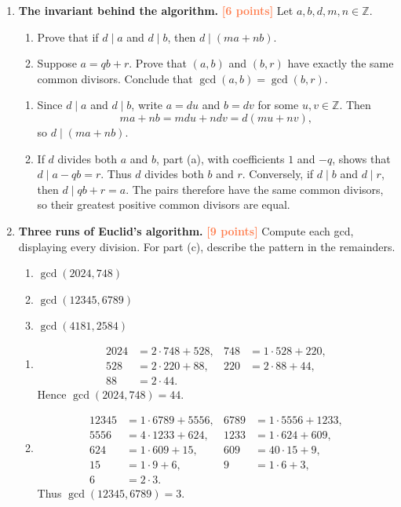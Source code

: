\documentclass[11pt]{article}
\newcommand{\Z}{\mathbb Z}
\newcommand{\divides}{\mid}
\newcommand{\points}[1]{\hfill\textcolor{coral}{\small\bfseries[#1 points]}}
\begin{document}
\begin{enumerate}
\item \textbf{The invariant behind the algorithm.} \points{6}
Let $a,b,d,m,n\in\Z$.
\begin{enumerate}
  \item Prove that if $d\divides a$ and $d\divides b$, then
  $d\divides(ma+nb)$.
  \item Suppose $a=qb+r$. Prove that $(a,b)$ and $(b,r)$ have exactly the
  same common divisors. Conclude that $\gcd(a,b)=\gcd(b,r)$.
\end{enumerate}
\begin{solution}
\begin{enumerate}
  \item Since $d\divides a$ and $d\divides b$, write $a=du$ and $b=dv$ for
  some $u,v\in\Z$. Then
  \[
    ma+nb=mdu+ndv=d(mu+nv),
  \]
  so $d\divides(ma+nb)$.
  \item If $d$ divides both $a$ and $b$, part (a), with coefficients $1$ and
  $-q$, shows that $d\divides a-qb=r$. Thus $d$ divides both $b$ and $r$.
  Conversely, if $d\divides b$ and $d\divides r$, then
  $d\divides qb+r=a$. The pairs therefore have the same common divisors, so
  their greatest positive common divisors are equal.
\end{enumerate}
\end{solution}

\item \textbf{Three runs of Euclid's algorithm.} \points{9}
Compute each gcd, displaying every division. For part (c), describe the pattern
in the remainders.
\begin{enumerate}
  \item $\gcd(2024,748)$
  \item $\gcd(12345,6789)$
  \item $\gcd(4181,2584)$
\end{enumerate}
\begin{solution}
\begin{enumerate}
  \item
  \begin{align*}
  2024&=2\cdot748+528,&748&=1\cdot528+220,\\
  528&=2\cdot220+88,&220&=2\cdot88+44,\\
  88&=2\cdot44.
  \end{align*}
  Hence $\gcd(2024,748)=44$.

  \item
  \begin{align*}
  12345&=1\cdot6789+5556,&6789&=1\cdot5556+1233,\\
  5556&=4\cdot1233+624,&1233&=1\cdot624+609,\\
  624&=1\cdot609+15,&609&=40\cdot15+9,\\
  15&=1\cdot9+6,&9&=1\cdot6+3,\\
  6&=2\cdot3.
  \end{align*}
  Thus $\gcd(12345,6789)=3$.


\end{enumerate}
\end{solution}
\end{enumerate}
\end{document}
